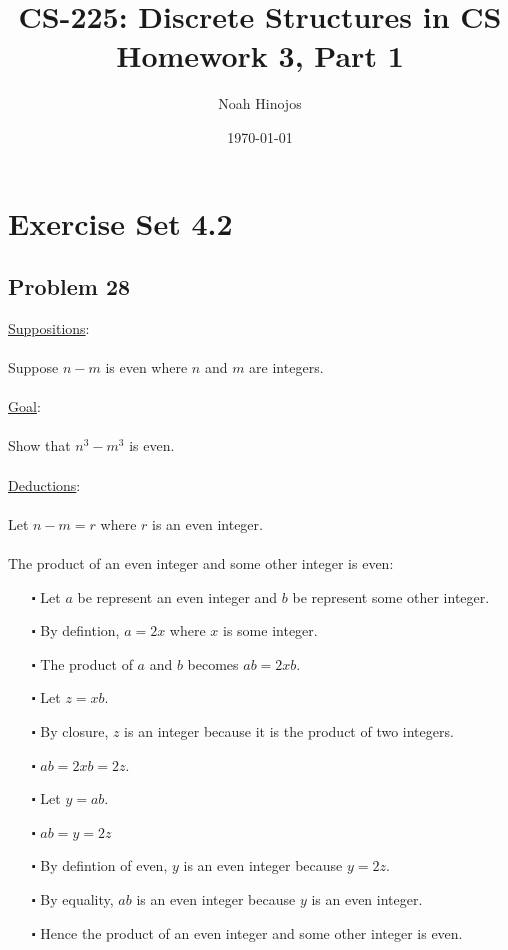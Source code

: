 \documentclass[12pt]{article}
\title{
  \textbf{CS-225: Discrete Structures in CS} \\
  Homework 3, Part 1
  }
\author{Noah Hinojos}
\date{\today}
\begin{document}
\maketitle

\section*{Exercise Set 4.2}

\subsection*{Problem 28}
\underline{Suppositions}:
\\ \\
Suppose $n-m$ is even where $n$ and $m$ are integers.
\\ \\
\underline{Goal}:
\\ \\
Show that $n^3-m^3$ is even.
\\ \\
\underline{Deductions}:
\\ \\
Let $n-m = r$ where $r$ is an even integer.
\newblock
\\ \\
The product of an even integer and some other integer is even:
\begin{itemize}
  \item [$\centerdot$] Let $a$ be represent an even integer and $b$ be represent some other integer.
  \item [$\centerdot$] By defintion, $a = 2x$ where $x$ is some integer.
  \item [$\centerdot$] The product of $a$ and $b$ becomes $ab = 2xb$.
  \item [$\centerdot$] Let $z = xb$.
  \item [$\centerdot$] By closure, $z$ is an integer because it is the product of two integers.
  \item [$\centerdot$] $ab= 2xb = 2z$.
  \item [$\centerdot$] Let $y = ab$. 
  \item [$\centerdot$] $ab = y = 2z$
  \item [$\centerdot$] By defintion of even, $y$ is an even integer because $y = 2z$.
  \item [$\centerdot$] By equality, $ab$ is an even integer because $y$ is an even integer.
  \item [$\centerdot$] Hence the product of an even integer and some other integer is even.
\end{itemize}
\end{document}
